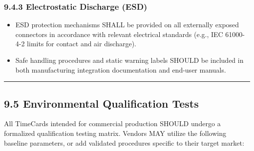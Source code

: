 \subsubsection{9.4.3 Electrostatic Discharge
(ESD)}\label{electrostatic-discharge-esd}

\begin{itemize}
\tightlist
\item
  ESD protection mechanisms SHALL be provided on all externally exposed
  connectors in accordance with relevant electrical standards (e.g., IEC
  61000-4-2 limits for contact and air discharge).\\
\item
  Safe handling procedures and static warning labels SHOULD be included
  in both manufacturing integration documentation and end-user manuals.
\end{itemize}

\begin{center}\rule{0.5\linewidth}{0.5pt}\end{center}

\subsection{9.5 Environmental Qualification
Tests}\label{environmental-qualification-tests}

All TimeCards intended for commercial production SHOULD undergo a
formalized qualification testing matrix. Vendors MAY utilize the
following baseline parameters, or add validated procedures specific to
their target market:

